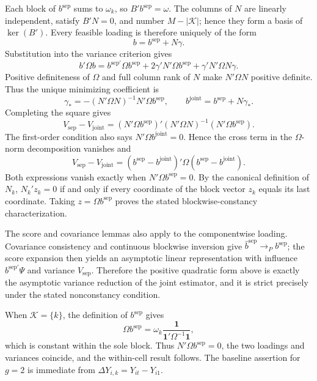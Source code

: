 Each block of \(b^{\mathrm{sep}}\) sums to \(\omega_k\), so \(B'b^{\mathrm{sep}}=\omega\).  The columns of \(N\) are linearly independent, satisfy \(B'N=0\), and number \(M-|\mathcal K|\); hence they form a basis of \(\ker(B')\).  Every feasible loading is therefore uniquely of the form
\[
 b=b^{\mathrm{sep}}+N\gamma.
\]
Substitution into the variance criterion gives
\[
 b'\Omega b
 =b^{\mathrm{sep}\prime}\Omega b^{\mathrm{sep}}
 +2\gamma'N'\Omega b^{\mathrm{sep}}
 +\gamma'N'\Omega N\gamma.
\]
Positive definiteness of \(\Omega\) and full column rank of \(N\) make \(N'\Omega N\) positive definite.  Thus the unique minimizing coefficient is
\[
 \gamma_* =-(N'\Omega N)^{-1}N'\Omega b^{\mathrm{sep}},
 \qquad
 b^{\mathrm{joint}}=b^{\mathrm{sep}}+N\gamma_*.
\]
Completing the square gives
\[
 V_{\mathrm{sep}}-V_{\mathrm{joint}}
 =(N'\Omega b^{\mathrm{sep}})'(N'\Omega N)^{-1}
   (N'\Omega b^{\mathrm{sep}}).
\]
The first-order condition also says \(N'\Omega b^{\mathrm{joint}}=0\).  Hence the cross term in the \(\Omega\)-norm decomposition vanishes and
\[
 V_{\mathrm{sep}}-V_{\mathrm{joint}}
 =(b^{\mathrm{sep}}-b^{\mathrm{joint}})'
   \Omega(b^{\mathrm{sep}}-b^{\mathrm{joint}}).
\]
Both expressions vanish exactly when \(N'\Omega b^{\mathrm{sep}}=0\).  By the canonical definition of \(N_k\), \(N_k'z_k=0\) if and only if every coordinate of the block vector \(z_k\) equals its last coordinate.  Taking \(z=\Omega b^{\mathrm{sep}}\) proves the stated blockwise-constancy characterization.

The score and covariance lemmas also apply to the componentwise loading.  Covariance consistency and continuous blockwise inversion give \(\widehat b^{\mathrm{sep}}\to_Pb^{\mathrm{sep}}\); the score expansion then yields an asymptotic linear representation with influence \(b^{\mathrm{sep}\prime}\Psi\) and variance \(V_{\mathrm{sep}}\).  Therefore the positive quadratic form above is exactly the asymptotic variance reduction of the joint estimator, and it is strict precisely under the stated nonconstancy condition.

When \(\mathcal K=\{k\}\), the definition of \(b^{\mathrm{sep}}\) gives
\[
 \Omega b^{\mathrm{sep}}
 =\omega_k\frac{\mathbf 1}{\mathbf 1'\Omega^{-1}\mathbf 1},
\]
which is constant within the sole block.  Thus \(N'\Omega b^{\mathrm{sep}}=0\), the two loadings and variances coincide, and the within-cell result follows.  The baseline assertion for \(g=2\) is immediate from \(\Delta Y_{i,k}=Y_{it}-Y_{i1}\).